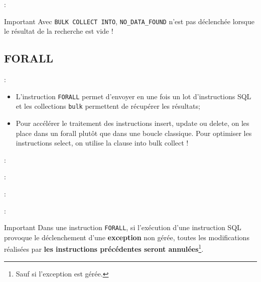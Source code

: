 \documentclass[10pt]{beamer}
\begin{document}
\begin{frame}{\secname : \subsecname}
    \begin{alertblock}{Important}
       Avec \lstinline[language=plsql]!BULK COLLECT INTO!, \lstinline[language=plsql]!NO_DATA_FOUND! n'est pas déclenchée lorsque le résultat de la recherche est vide !
    \end{alertblock}
\end{frame}

\subsection{FORALL}
\begin{frame}{\secname : \subsecname}
\begin{itemize}
    \item L'instruction \lstinline[language=plsql]!FORALL! permet d'envoyer en une fois un lot d'instructions SQL et les collections \lstinline[language=plsql]!bulk! permettent de récupérer les résultats;
    \item Pour accélérer le traitement des instructions insert, update ou delete, on les place dans un forall plutôt que dans une boucle classique.  Pour optimiser les instructions select, on utilise la clause into bulk collect !
\end{itemize}
\end{frame}

\begin{frame}{\secname : \subsecname}
    
\end{frame}

\begin{frame}[allowframebreaks]{\secname : \subsecname}
    
\end{frame}

\begin{frame}[allowframebreaks]{\secname : \subsecname}
    
\end{frame}


\begin{frame}[allowframebreaks]{\secname : \subsecname}
    \begin{alertblock}{Important}
        Dans une instruction \lstinline[language=plsql]!FORALL!, si l'exécution d'une instruction SQL provoque le déclenchement d'une \textbf{exception} non gérée, toutes les modifications réalisées par \textbf{les instructions précédentes seront annulées}\footnote{Sauf si l'exception est gérée.}.
    \end{alertblock}
\end{frame}
\end{document}
